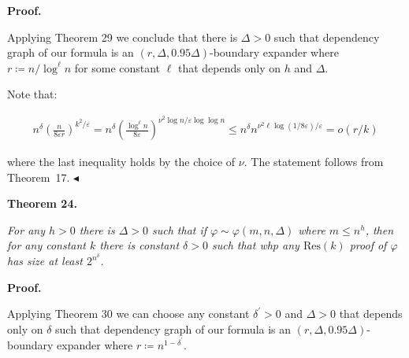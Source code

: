 \par\medskip\noindent\textbf{Proof.}\par




Applying Theorem 29 we conclude that there is $\Delta>0$ such that
dependency graph of our formula is an $(r,\Delta,0.95\Delta)$-boundary expander where $r\coloneqq n/\log^{\ell}n$ for some constant $\ell$ that depends only on $h$ and $\Delta$.\par




Note that:\par


\[\begin{gathered}
n^{\delta}\left(\frac{n}{8\varepsilon r}\right)^{k^{2}/\varepsilon}=n^{\delta}%
\left(\frac{\log^{\ell}n}{8\varepsilon}\right)^{\nu^{2}\log n/\varepsilon\log%
\log n}\leq n^{\delta}n^{\nu^{2}\ell\log(1/8\varepsilon)/\varepsilon}=o(r/k)
\end{gathered}\]


where the last inequality holds by the choice of $\nu$. The statement follows from Theorem 17.
$\blacktriangleleft$\par





\par\medskip\noindent\textbf{
\textbf{Theorem 24}\textbf{.}
}\par



\emph{For any $h>0$ there is $\Delta>0$ such that if $\varphi\sim\varphi(m,n,\Delta)$ where
$m\leq n^{h}$, then for any constant $k$ there is constant $\delta>0$ such that whp any $\mathrm{Res}(k)$
proof of $\varphi$ has size at least $2^{n^{\delta}}$.}\par







\par\medskip\noindent\textbf{Proof.}\par




Applying Theorem 30 we can choose any constant $\delta^{\prime}>0$ and $\Delta>0$
that depends only on $\delta$ such that dependency graph of our formula is an $(r,\Delta,0.95\Delta)$-boundary expander where $r\coloneqq n^{1-\delta^{\prime}}$.\par





